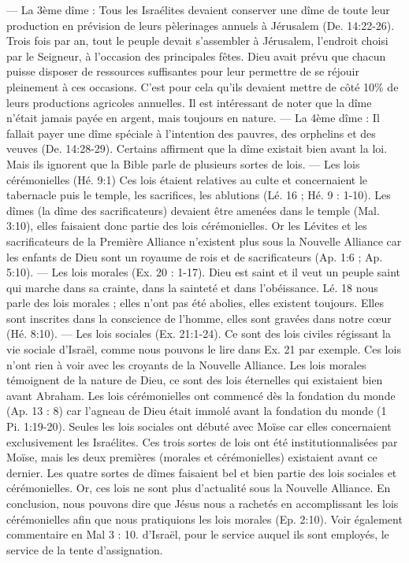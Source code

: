 \begin{multicols}{2}
{— La 3ème dîme : Tous les Israélites devaient conserver une dîme de toute leur production en prévision de leurs pèlerinages annuels à Jérusalem (De. 14:22-26).
Trois fois par an, tout le peuple devait s'assembler à Jérusalem, l'endroit choisi par le Seigneur, à l'occasion des principales fêtes. Dieu avait prévu que chacun puisse disposer de ressources suffisantes pour leur permettre de se réjouir pleinement à ces occasions. C'est pour cela qu'ils devaient mettre de côté 10\% de leurs productions agricoles annuelles. Il est intéressant de noter que la dîme n'était jamais payée en argent, mais toujours en nature.
— La 4ème dîme : Il fallait payer une dîme spéciale à l'intention des pauvres, des orphelins et des veuves (De. 14:28-29). 
Certains affirment que la dîme existait bien avant la loi. Mais ils ignorent que la Bible parle de plusieurs sortes de lois.
— Les lois cérémonielles (Hé. 9:1)
Ces lois étaient relatives au culte et concernaient le tabernacle puis le temple, les sacrifices, les ablutions (Lé. 16 ; Hé. 9 : 1-10). Les dîmes (la dîme des sacrificateurs) devaient être amenées dans le temple (Mal. 3:10), elles faisaient donc partie des lois cérémonielles. Or les Lévites et les sacrificateurs de la Première Alliance n'existent plus sous la Nouvelle Alliance car les enfants de Dieu sont un royaume de rois et de sacrificateurs (Ap. 1:6 ; Ap. 5:10).
— Les lois morales (Ex. 20 : 1-17). Dieu est saint et il veut un peuple saint qui marche dans sa crainte, dans la sainteté et dans l'obéissance. Lé. 18 nous parle des lois morales ; elles n'ont pas été abolies, elles existent toujours. Elles sont inscrites dans la conscience de l'homme, elles sont gravées dans notre cœur (Hé. 8:10).
— Les lois sociales (Ex. 21:1-24). Ce sont des lois civiles régissant la vie sociale d'Israël, comme nous pouvons le lire dans Ex. 21 par exemple. Ces lois n'ont rien à voir avec les croyants de la Nouvelle Alliance. Les lois morales témoignent de la nature de Dieu, ce sont des lois éternelles qui existaient bien avant Abraham. Les lois cérémonielles ont commencé dès la fondation du monde (Ap. 13 : 8) car l'agneau de Dieu était immolé avant la fondation du monde (1 Pi. 1:19-20). Seules les lois sociales ont débuté avec Moïse car elles concernaient exclusivement les Israélites. Ces trois sortes de lois ont été institutionnalisées par Moïse, mais les deux premières (morales et cérémonielles) existaient avant ce dernier. Les quatre sortes de dîmes faisaient bel et bien partie des lois sociales et cérémonielles. Or, ces lois ne sont plus d'actualité sous la Nouvelle Alliance. En conclusion, nous pouvons dire que Jésus nous a rachetés en accomplissant les lois cérémonielles afin que nous pratiquions les lois morales (Ep. 2:10). Voir également commentaire en Mal 3 : 10.} d'Israël, pour le service auquel ils sont employés, le service de la tente d'assignation.

\end{multicols}
